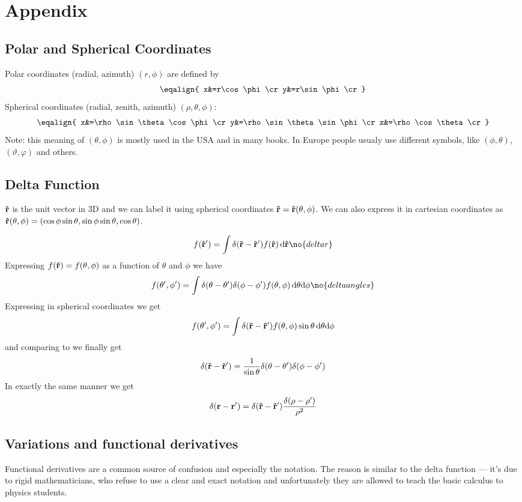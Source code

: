 \chapter{Appendix}

\section{Polar and Spherical Coordinates}

Polar coordinates (radial, azimuth) $(r,\phi)$ are defined by
$$\eqalign{
x&=r\cos\phi\cr
y&=r\sin\phi\cr
}$$
Spherical coordinates (radial, zenith, azimuth) $(\rho,\theta,\phi)$:
$$\eqalign{
x&=\rho\sin\theta\cos\phi\cr
y&=\rho\sin\theta\sin\phi\cr
z&=\rho\cos\theta\cr
}$$
Note: this meaning of $(\theta,\phi)$ is mostly used in the USA and in many
books. In Europe people usualy use different symbols, like 
$(\phi,\theta)$, $(\vartheta,\varphi)$ and others.

\section{Delta Function}

${\bf\hat r}$ is the unit vector in 3D and we can label it using
spherical coordinates ${\bf\hat r}={\bf\hat r}(\theta,\phi)$. We can also
express it in cartesian coordinates as 
${\bf\hat r}(\theta,\phi)=(\cos\phi\sin\theta,\sin\phi\sin\theta,\cos\theta)$.

$$f({\bf\hat r'})=\int\delta({\bf\hat r}-{\bf\hat r'})f({\bf\hat r})\,\d
{\bf\hat r}\no{deltar}$$
Expressing $f({\bf\hat r})=f(\theta,\phi)$ as a function of $\theta$ and $\phi$
we have
$$f(\theta',\phi')=\int\delta(\theta-\theta')\delta(\phi-\phi')
f(\theta,\phi)\,\d\theta\d\phi\no{deltaangles}$$
Expressing  in spherical coordinates we get
$$f(\theta',\phi')=\int\delta({\bf\hat r}-{\bf\hat r'})
f(\theta,\phi)\sin\theta\,{\rm d}\theta{\rm d}\phi$$
and comparing to  we finally get
$$\delta({\bf\hat r}-{\bf\hat r'})={1\over\sin\theta}
\delta(\theta-\theta')\delta(\phi-\phi')$$
In exactly the same manner we get
$$\delta({\bf r}-{\bf r'})=\delta({\bf\hat r}-{\bf\hat r'})
{\delta(\rho-\rho')\over\rho^2}$$

\section{Variations and functional derivatives}

Functional derivatives are a common source of confusion and especially the
notation. The reason is similar to the delta function --- it's due to rigid
mathematicians, who refuse to use a clear and exact notation and unfortunately
they are allowed to teach the basic calculus to physics students.

